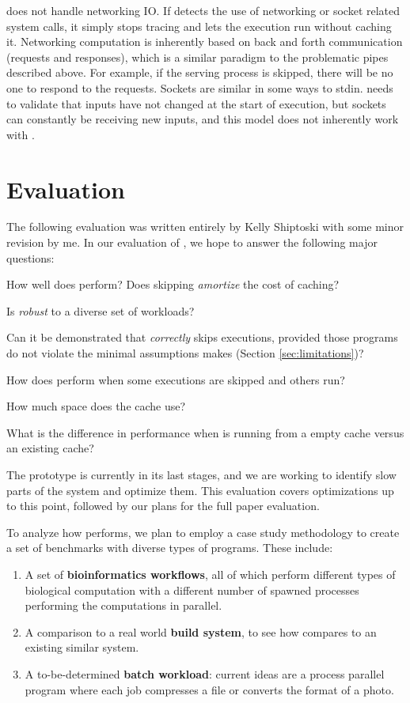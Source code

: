 \pc does not handle networking IO. If \pc detects the use of networking or socket related system calls, it simply stops tracing and lets the execution run without caching it. Networking computation is inherently based on back and forth communication (requests and responses), which is a similar paradigm to the problematic pipes described above. For example, if the serving process is skipped, there will be no one to respond to the requests. Sockets are similar in some ways to stdin. \pc needs to validate that inputs have not changed at the start of execution, but sockets can constantly be receiving new inputs, and this model does not inherently work with \pc.

\section{Evaluation}
The following evaluation was written entirely by Kelly Shiptoski with some minor revision by me. In our evaluation of \pc, we hope to answer the following major questions:
\begin{compactitem}
 
    \item How well does \pc perform? Does skipping \textit{amortize} the cost of caching?
    \item Is \pc \textit{robust} to a diverse set of workloads?
    \item Can it be demonstrated that \pc \textit{correctly} skips executions, provided those programs do not violate the minimal assumptions \pc makes (Section \ref{sec:limitations})?
    \item How does \pc perform when some executions are skipped and others run?
    \item How much space does the cache use?
    \item What is the difference in performance when \pc is running from a empty cache versus an existing cache?
\end{compactitem}

The \pc prototype is currently in its last stages, and we are working to identify slow parts of the system and optimize them. This evaluation covers optimizations up to this point, followed by our plans for the full paper evaluation.

To analyze how \pc performs, we plan to employ a case study methodology to create a set of benchmarks with diverse types of programs. These include:
\begin{enumerate}
    \item A set of \textbf{bioinformatics workflows}, all of which perform different types of biological computation with a different number of spawned processes performing the computations in parallel.
    \item A comparison to a real world \textbf{build system}, to see how \pc compares to an existing similar system.
    \item A to-be-determined \textbf{batch workload}: current ideas are a process parallel program where each job compresses a file or converts the format of a photo.
\end{enumerate}

